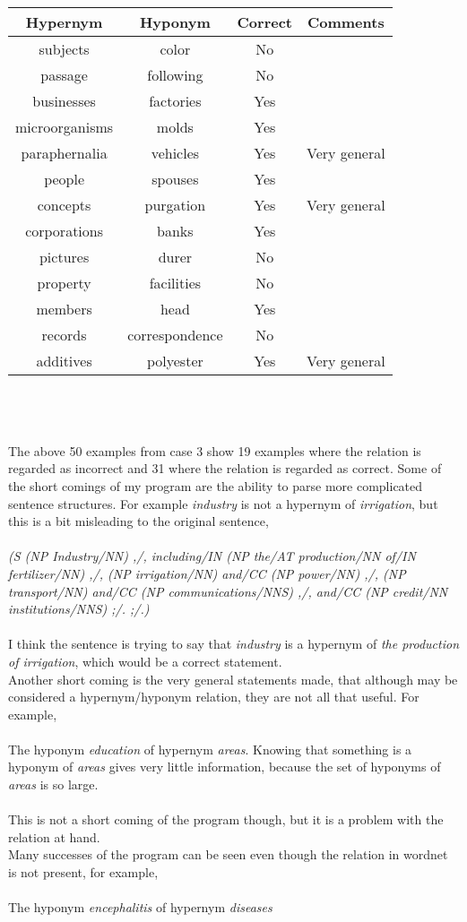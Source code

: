 \documentclass[11pt]{article}
\begin{document}
\begin{tabular}{c c c c}
Hypernym & Hyponym & Correct & Comments \\ \hline
subjects & color & No\\
passage & following & No\\
businesses & factories & Yes\\
microorganisms & molds & Yes\\
paraphernalia & vehicles & Yes & Very general\\
people & spouses & Yes\\
concepts & purgation & Yes & Very general\\
corporations & banks & Yes\\
pictures & durer & No\\
property & facilities & No\\
members & head & Yes\\
records & correspondence & No\\
additives & polyester & Yes & Very general \\
\end{tabular}
\\ \\ \\
The above 50 examples from case 3 show 19 examples where the relation is regarded as incorrect and 31 where the relation is regarded as correct. Some of the short comings of my program are the ability to parse more complicated sentence structures. For example \textit{industry} is not a hypernym of \textit{irrigation}, but this is a bit misleading to the original sentence,\\ \\
\small
\textit{ (S  (NP Industry/NN)  ,/,  including/IN  (NP the/AT production/NN of/IN fertilizer/NN)  ,/,  (NP irrigation/NN)  and/CC  (NP power/NN)  ,/,  (NP transport/NN)  and/CC  (NP communications/NNS)  ,/,  and/CC  (NP credit/NN institutions/NNS)  ;/.  ;/.) }\\ \\ \normalsize
I think the sentence is trying to say that \textit{industry} is a hypernym of \textit{the production of irrigation}, which would be a correct statement.\\
Another short coming is the very general statements made, that although may be considered a hypernym/hyponym relation, they are not all that useful. For example, \\ \\
The hyponym \textit{education} of hypernym \textit{areas}. Knowing that something is a hyponym of \textit{areas} gives very little information, because the set of hyponyms of \textit{areas} is so large.\\ \\
This is not a short coming of the program though, but it is a problem with the relation at hand. \\
Many successes of the program can be seen even though the relation in wordnet is not present, for example,\\ \\
The hyponym \textit{encephalitis} of hypernym \textit{diseases}\\
\end{document}
